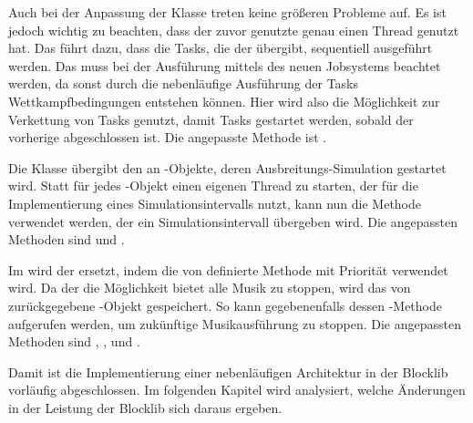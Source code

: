 Auch bei der Anpassung der Klasse \classEventManager{} treten keine größeren Probleme auf. Es ist jedoch wichtig zu beachten, dass der zuvor genutzte \classExecutorService{} genau einen Thread genutzt hat. Das führt dazu, dass die Tasks, die der \classEventManager{} übergibt, sequentiell ausgeführt werden. Das muss bei der Ausführung mittels des neuen Jobsystems beachtet werden, da sonst durch die nebenläufige Ausführung der Tasks Wettkampfbedingungen entstehen können. Hier wird also die Möglichkeit zur Verkettung von Tasks genutzt, damit Tasks gestartet werden, sobald der vorherige abgeschlossen ist. Die angepasste Methode ist .

Die Klasse \classFluidManager{} übergibt den \classBlocklibExecutor{} an \classFluid{}-Objekte, deren Ausbreitungs-Simulation gestartet wird. Statt für jedes \classFluid{}-Objekt einen eigenen Thread zu starten, der  für die Implementierung eines Simulationsintervalls nutzt, kann nun die Methode  verwendet werden, der ein Simulationsintervall übergeben wird. Die angepassten Methoden sind  und .

Im \classAudioManager{} wird der \classTimer{} ersetzt, indem die von \classBlocklibExecutorService{} definierte Methode  mit Priorität  verwendet wird. Da der \classAudioManager{} die Möglichkeit bietet alle Musik zu stoppen, wird das von  zurückgegebene \classFuture{}-Objekt gespeichert. So kann gegebenenfalls dessen -Methode aufgerufen werden, um zukünftige Musikausführung zu stoppen. Die angepassten Methoden sind , ,  und .

Damit ist die Implementierung einer nebenläufigen Architektur in der Blocklib vorläufig abgeschlossen. Im folgenden Kapitel wird analysiert, welche Änderungen in der Leistung der Blocklib sich daraus ergeben.